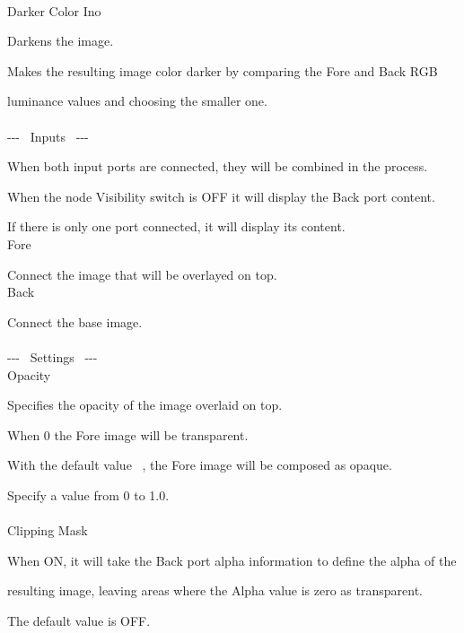 \documentclass[a4paper,12pt]{article}
\begin{document}
\thispagestyle{empty}

\Large
\noindent \\
Darker Color Ino\medskip
\par
\normalsize
Darkens the image.\par
Makes the resulting image color darker by comparing the Fore and Back RGB\par 
luminance values and choosing the smaller one.\\
\\
-{-}- \ Inputs \ -{-}-\par
When both input ports are connected, they will be combined in the process.\par
When the node Visibility switch is OFF it will display the Back port content.\par
If there is only one port connected, it will display its content.\\
Fore\par
Connect the image that will be overlayed on top.\\
Back\par
Connect the base image.\\
\\
-{-}- \ Settings \ -{-}-\\
Opacity\par
Specifies the opacity of the image overlaid on top.\par
When 0 the Fore image will be transparent.\par
With the default value \textquotedbl \ , the Fore image will be composed as opaque.\par
Specify a value from 0 to 1.0.\\
\\
Clipping Mask\par
When ON, it will take the Back port alpha information to define the alpha of the\par
resulting image, leaving areas where the Alpha value is zero as transparent.\par
The default value is OFF.
\end{document}
